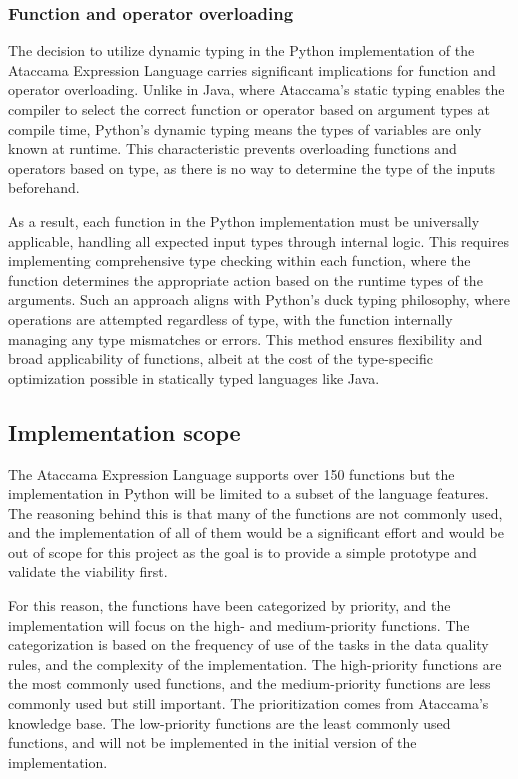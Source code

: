 \subsubsection{Function and operator overloading}

The decision to utilize dynamic typing in the Python implementation of the Ataccama Expression Language carries significant implications for function and operator overloading. Unlike in Java, where Ataccama's static typing enables the compiler to select the correct function or operator based on argument types at compile time, Python's dynamic typing means the types of variables are only known at runtime. This characteristic prevents overloading functions and operators based on type, as there is no way to determine the type of the inputs beforehand.

As a result, each function in the Python implementation must be universally applicable, handling all expected input types through internal logic. This requires implementing comprehensive type checking within each function, where the function determines the appropriate action based on the runtime types of the arguments. Such an approach aligns with Python’s duck typing philosophy, where operations are attempted regardless of type, with the function internally managing any type mismatches or errors. This method ensures flexibility and broad applicability of functions, albeit at the cost of the type-specific optimization possible in statically typed languages like Java.

\subsection{Implementation scope}

The Ataccama Expression Language supports over 150 functions but the implementation in Python will be limited to a subset of
the language features. The reasoning behind this is that many of the functions are
not commonly used, and the implementation of all of them would be a significant
effort and would be out of scope for this project as the goal is to provide a simple
prototype and validate the viability first. 

For this reason, the functions have been categorized by priority, and the implementation will
focus on the high- and medium-priority functions. The categorization is based on the frequency of use of the tasks in the data quality rules, and the complexity of the implementation. The high-priority functions are the most commonly used functions, and the medium-priority functions are less commonly used but still important. 
The prioritization comes from Ataccama's knowledge base. The low-priority functions are the least commonly used functions, and will not be implemented in the initial version of the implementation. 

